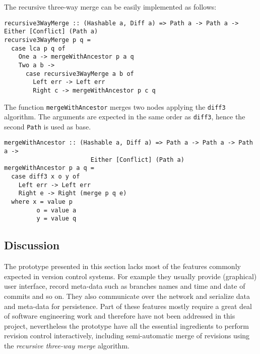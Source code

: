 \documentclass[../Thesis.tex]{subfiles}
\begin{document}
	The recursive three-way merge can be easily implemented as follows:

\begin{verbatim}
recursive3WayMerge :: (Hashable a, Diff a) => Path a -> Path a -> Either [Conflict] (Path a)
recursive3WayMerge p q = 
  case lca p q of
    One a -> mergeWithAncestor p a q 
    Two a b ->  
      case recursive3WayMerge a b of
        Left err -> Left err 
        Right c -> mergeWithAncestor p c q 
\end{verbatim}

	The function \texttt{mergeWithAncestor} merges two
	nodes applying the \texttt{diff3} algorithm. The arguments
	are expected in the same order as \texttt{diff3}, hence the second 
	\texttt{Path} is used as base.

\begin{verbatim}	
mergeWithAncestor :: (Hashable a, Diff a) => Path a -> Path a -> Path a -> 
                        Either [Conflict] (Path a)
mergeWithAncestor p a q = 
  case diff3 x o y of
    Left err -> Left err 
    Right e -> Right (merge p q e)
  where x = value p
         o = value a
         y = value q
\end{verbatim}
	
	\subsection{Discussion}
	The prototype presented in this section lacks most of the
	features commonly expected in version control systems.
	For example they usually provide (graphical) user interface, 
	record meta-data 
	such as branches names and time and date of 
	commits and so on. They also communicate over the 
	network and serialize data and meta-data for persistence.
	Part of these features mostly require a great deal of 
	software engineering work and therefore have not
	been addressed in this project,
	nevertheless the prototype have all the essential ingredients
	to perform revision control interactively, including
	semi-automatic merge of revisions using the \emph{recursive three-way
	merge} algorithm.
	
\end{document}
